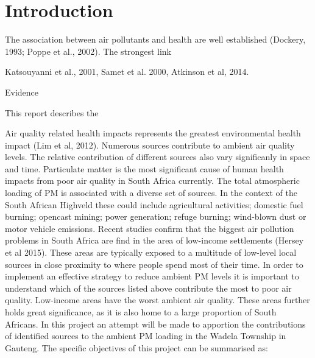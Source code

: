 \documentclass{nwureport}
\begin{document}
\clearpage

\dominitoc
\setcounter{tocdepth}{2} %
\pagestyle{plain}
{\thispagestyle{plain}
\tableofcontents
\clearpage
\listoffigures
{}
\clearpage
\listoftables
{}
\printglossaries
}

\pagestyle{mainmatter}


\chapter{Introduction}

The association between air pollutants and health are well established (Dockery, 1993; Poppe et al., 2002). The strongest link

Katsouyanni et al., 2001, Samet et al. 2000, Atkinson et al, 2014.

Evidence 

This report describes the 

Air quality related health impacts represents the greatest environmental health impact (Lim et al, 2012).
Numerous sources contribute to ambient air quality levels. The relative contribution of different sources also
vary significanly in space and time. Particulate matter is the most significant cause of human health impacts
from poor air quality in South Africa currently. The total atmospheric loading of PM is associated with a
diverse set of sources. In the context of the South African Highveld these could include agricultural activities;
domestic fuel burning; opencast mining; power generation; refuge burning; wind-blown dust or motor vehicle
emissions. Recent studies confirm that the biggest air pollution problems in South Africa are find in the area
of low-income settlements (Hersey et al 2015). These areas are typically exposed to a multitude of low-level
local sources in close proximity to where people spend most of their time. In order to implement an effective
strategy to reduce ambient PM levels it is important to understand which of the sources listed above
contribute the most to poor air quality. Low-income areas have the worst ambient air quality. These areas
further holds great significance, as it is also home to a large proportion of South Africans. In this project an
attempt will be made to apportion the contributions of identified sources to the ambient PM loading in the
Wadela Township in Gauteng. The specific objectives of this project can be summarised as:
\end{document}
